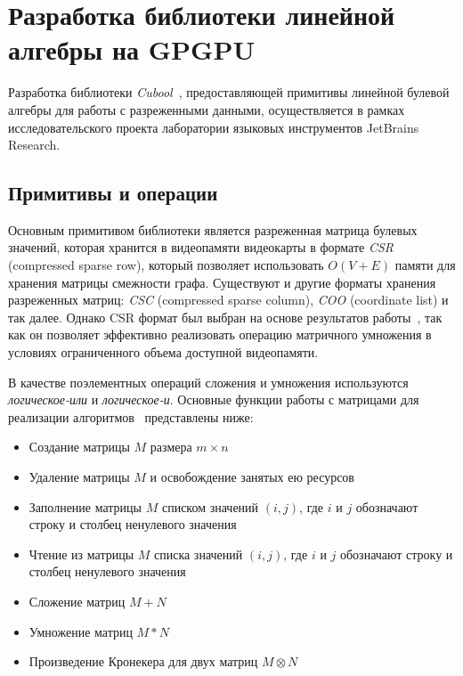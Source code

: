\section{Разработка библиотеки линейной алгебры на GPGPU}

Разработка библиотеки \textit{Cubool}~\cite{net:cubool_project}, предоставляющей примитивы линейной булевой алгебры для работы с разреженными данными, осуществляется в рамках исследовательского проекта лаборатории языковых инструментов JetBrains Research.

\subsection{Примитивы и операции}

Основным примитивом библиотеки является разреженная матрица булевых значений, которая хранится в видеопамяти видеокарты в формате \textit{CSR} (compressed sparse row), который позволяет использовать $O(V + E)$ памяти для хранения матрицы смежности графа. Существуют и другие форматы хранения разреженных матриц: \textit{CSC} (compressed sparse column), \textit{COO} (coordinate list) и так далее. Однако CSR формат был выбран на основе результатов работы~\cite{inproceedings:spgemm_mem_saving_for_nvidia}, так как он позволяет эффективно реализовать операцию матричного умножения в условиях ограниченного объема доступной видеопамяти. 

В качестве поэлементных операций сложения и умножения используются \textit{логическое-или} и \textit{логическое-и}. Основные функции работы с матрицами для реализации алгоритмов~\cite{inproceedings:matrix_cfpq, inbook:kronecker_cfpq_adbis} представлены ниже:

\begin{itemize}
    \item Создание матрицы $M$ размера $m \times n$
    \item Удаление матрицы $M$ и освобождение занятых ею ресурсов
    \item Заполнение матрицы $M$ списком значений $(i, j)$, где $i$ и $j$ обозначают строку и столбец ненулевого значения
    \item Чтение из матрицы $M$ списка значений $(i, j)$, где $i$ и $j$ обозначают строку и столбец ненулевого значения
    \item Сложение матриц $M + N$
    \item Умножение матриц $M * N$
    \item Произведение Кронекера для двух матриц $M \otimes N$
\end{itemize}

